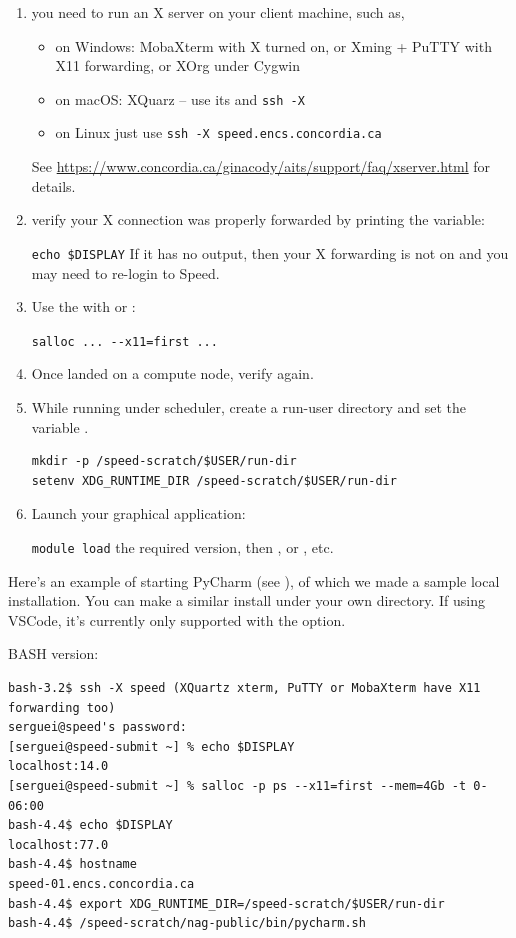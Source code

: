\begin{enumerate}
\item
you need to run an X server on your client machine, such as,
\begin{itemize}
\item on Windows: MobaXterm with X turned on, or Xming + PuTTY with X11 forwarding, or XOrg under Cygwin
\item on macOS: XQuarz -- use its  and \texttt{ssh -X}
\item on Linux just use \texttt{ssh -X speed.encs.concordia.ca} 
\end{itemize}

See \url{https://www.concordia.ca/ginacody/aits/support/faq/xserver.html}
for details.

\item
verify your X connection was properly forwarded by printing the  variable:

\verb+echo $DISPLAY+
If it has no output, then your X forwarding is not on and you may need to re-login to Speed.

\item
Use the  with  or :

\verb+salloc ... --x11=first ...+

\item
Once landed on a compute node, verify  again.

\item
While running under scheduler, create a run-user directory and set the variable .
\begin{verbatim}
mkdir -p /speed-scratch/$USER/run-dir
setenv XDG_RUNTIME_DIR /speed-scratch/$USER/run-dir
\end{verbatim}

\item
Launch your graphical application:

\texttt{module load} the required version, then
, or , etc.
\end{enumerate}

Here's an example of starting PyCharm (see ), of which we made a sample local installation.
You can make a similar install under your own directory. If using VSCode, it's
currently only supported with the  option. \newline

BASH version:

\scriptsize
\begin{verbatim}
bash-3.2$ ssh -X speed (XQuartz xterm, PuTTY or MobaXterm have X11 forwarding too)
serguei@speed's password: 
[serguei@speed-submit ~] % echo $DISPLAY
localhost:14.0
[serguei@speed-submit ~] % salloc -p ps --x11=first --mem=4Gb -t 0-06:00 
bash-4.4$ echo $DISPLAY
localhost:77.0
bash-4.4$ hostname
speed-01.encs.concordia.ca
bash-4.4$ export XDG_RUNTIME_DIR=/speed-scratch/$USER/run-dir
bash-4.4$ /speed-scratch/nag-public/bin/pycharm.sh
\end{verbatim}
\normalsize

